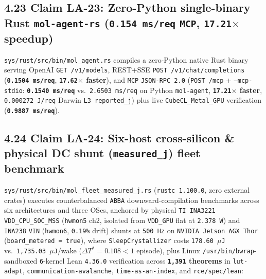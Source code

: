 \documentclass[10pt]{article}
\begin{document}
\subsection{4.23 Claim LA-23: Zero-Python single-binary Rust \texttt{mol-agent-rs} (\texttt{0.154 ms/req} \texttt{MCP}, \texttt{17.21\texorpdfstring{$\times$}{x}} speedup)}\label{claim-la23}

\texttt{sys/rust/src/bin/mol\_agent.rs} compiles a zero-Python native Rust binary serving OpenAI \texttt{GET /v1/models}, REST+SSE \texttt{POST /v1/chat/completions} (\textbf{\texttt{0.1504 ms/req}}, \textbf{\texttt{17.62$\times$} faster}), and \texttt{MCP} \texttt{JSON-RPC 2.0} (\texttt{POST /mcp} + \texttt{--mcp-stdio}: \textbf{\texttt{0.1540 ms/req}} vs.\ \texttt{2.6503 ms/req} on Python \texttt{mol-agent}, \textbf{\texttt{17.21$\times$} faster}, \texttt{0.000272 J/req} Darwin \texttt{L3 reported\_j}) plus live \texttt{CubeCL\_Metal\_GPU} verification (\textbf{\texttt{0.9887 ms/req}}).

\subsection{4.24 Claim LA-24: Six-host cross-silicon \& physical DC shunt (\texttt{measured\_j}) fleet benchmark}\label{claim-la24}

\texttt{sys/rust/src/bin/mol\_fleet\_measured\_j.rs} (\texttt{rustc 1.100.0}, zero external crates) executes counterbalanced \texttt{ABBA} downward-compilation benchmarks across six architectures and three OSes, anchored by physical \texttt{TI INA3221} \texttt{VDD\_CPU\_SOC\_MSS} (\texttt{hwmon5} ch2, isolated from \texttt{VDD\_GPU} flat at \texttt{2.378 W}) and \texttt{INA238} \texttt{VIN} (\texttt{hwmon6}, \texttt{0.19\%} drift) shunts at \texttt{500 Hz} on \texttt{NVIDIA Jetson AGX Thor} (\texttt{board\_metered = true}), where \texttt{SleepCrystallizer} costs \texttt{178.60 $\mu$J} vs.\ \texttt{1,735.03 $\mu$J}/wake ($\Delta T^* = 0.108 < 1$ episode), plus Linux \texttt{/usr/bin/bwrap}-sandboxed \texttt{6}-kernel Lean \texttt{4.36.0} verification across \textbf{\texttt{1,391} theorems} in \texttt{lut-adapt}, \texttt{communication-avalanche}, \texttt{time-as-an-index}, and \texttt{rce/spec/lean}:
\end{document}
